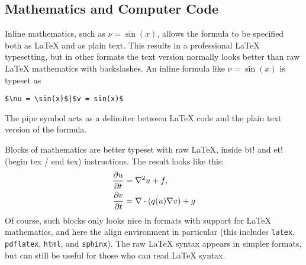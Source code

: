 \documentclass[twoside]{article}
\begin{document}
\noindent

\subsection{Mathematics and Computer Code}

Inline mathematics, such as $\nu = \sin(x)$,
allows the formula to be specified both as {\LaTeX} and as plain text.
This results in a professional {\LaTeX} typesetting, but in other formats
the text version normally looks better than raw {\LaTeX} mathematics with
backslashes. An inline formula like $\nu = \sin(x)$ is
typeset as
\begin{Verbatim}[fontsize=\fontsize{9pt}{9pt},tabsize=8,baselinestretch=0.85,
fontfamily=tt,xleftmargin=7mm]
$\nu = \sin(x)$|$v = sin(x)$
\end{Verbatim}
\noindent
The pipe symbol acts as a delimiter between {\LaTeX} code and the plain text
version of the formula.

Blocks of mathematics are better typeset with raw {\LaTeX}, inside
{\fontsize{10pt}{10pt}\verb!!bt!} and {\fontsize{10pt}{10pt}\verb!!et!} (begin tex / end tex) instructions.
The result looks like this:
\begin{align}
{\partial u\over\partial t} &= \nabla^2 u + f, \label{myeq1}\\
{\partial v\over\partial t} &= \nabla\cdot(q(u)\nabla v) + g
\end{align}
Of course, such blocks only looks nice in formats with support
for {\LaTeX} mathematics, and here the align environment in particular
(this includes {\fontsize{10pt}{10pt}\verb!latex!}, {\fontsize{10pt}{10pt}\verb!pdflatex!}, {\fontsize{10pt}{10pt}\verb!html!}, and {\fontsize{10pt}{10pt}\verb!sphinx!}). The raw
{\LaTeX} syntax appears in simpler formats, but can still be useful
for those who can read {\LaTeX} syntax.
\end{document}
